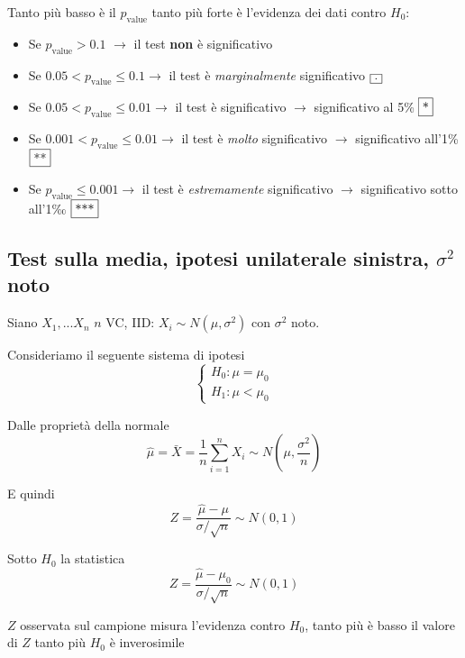 \documentclass[
  11pt,
]{book}
\providecommand{\tightlist}{%
  \setlength{\itemsep}{0pt}\setlength{\parskip}{0pt}}
\theoremstyle{mytheoremstyle}
\theoremstyle{mydefstyle}
\newenvironment{nota}
  {
\begin{tcolorbox}[enhanced,breakable,arc=0.1mm,boxrule=1pt,colback=white,colframe=iblue,title=\bf \fontfamily{lmss}\selectfont \faInfoCircle \hspace{.5 cm} Nota,drop fuzzy shadow]
}{
\end{tcolorbox}
  }
\begin{document}
\begin{nota}

Tanto più basso è il \(p_\text{value}\) tanto più forte è l'evidenza dei
dati contro \(H_0\):

\begin{itemize}
\tightlist
\item
  Se \(p_\text{value}>0.1\) \(\rightarrow\) il test \textbf{non} è significativo
\item
  Se \(0.05< p_\text{value}\le 0.1\rightarrow\) il test è \emph{marginalmente} significativo \(\fbox{.}\)
\item
  Se \(0.05< p_\text{value}\le 0.01\rightarrow\) il test è significativo
  \(\rightarrow\) significativo al 5\% \(\fbox{*}\)
\item
  Se \(0.001< p_\text{value}\le 0.01\rightarrow\) il test è \emph{molto} significativo \(\rightarrow\) significativo all'1\% \(\fbox{**}\)
\item
  Se \(p_\text{value}\le 0.001\rightarrow\) il test è \emph{estremamente} significativo \(\rightarrow\) significativo sotto all'1‰ \(\fbox{***}\)
\end{itemize}

\end{nota}

\subsection{\texorpdfstring{Test sulla media, ipotesi unilaterale sinistra, \(\sigma^2\) noto}{Test sulla media, ipotesi unilaterale sinistra, \textbackslash sigma\^{}2 noto}}\label{test-sulla-media-ipotesi-unilaterale-sinistra-sigma2-noto}

Siano \(X_1,...X_n\) \(n\) VC, IID: \(X_i\sim N(\mu,\sigma^2)\) con \(\sigma^2\)
noto.

Consideriamo il seguente sistema di ipotesi \[\begin{cases}
H_0:\mu=\mu_0\\
H_1:\mu<\mu_0
\end{cases}\]

Dalle proprietà della normale
\[\hat\mu=\bar X=\frac 1 n\sum_{i=1}^nX_i\sim N\left(\mu,\frac{\sigma^2} {n}\right)\]

E quindi \[Z=\frac{\hat\mu-\mu}{\sigma/\sqrt n}\sim N(0,1)\]

Sotto \(H_0\) la statistica
\[Z=\frac{\hat\mu-\mu_0}{\sigma/\sqrt n}\sim N(0,1)\]

\(Z\) osservata sul campione misura l'evidenza contro \(H_0\), tanto più è
basso il valore di \(Z\) tanto più \(H_0\) è inverosimile
\end{document}
